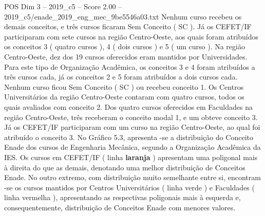 \begin{textsample}{POS Dim 3 – 2019\_c5 – Score 2.00 – 2019\_c5/enade\_2019\_eng\_mec\_9be5546a03.txt}
Nenhum curso recebeu os demais conceitos, e três cursos ficaram Sem Conceito ( SC ).
Já os CEFET/IF participaram com sete cursos na região Centro-Oeste, aos quais foram atribuídos os conceitos 3 ( quatro cursos ), 4 ( dois cursos ) e 5 ( um curso ).
Na região Centro-Oeste, dez dos 19 cursos oferecidos eram mantidos por Universidades.
Para este tipo de Organização Acadêmica, os conceitos 3 e 4 foram atribuídos a três cursos cada, já os conceitos 2 e 5 foram atribuídos a dois cursos cada.
Nenhum curso ficou Sem Conceito ( SC ) ou recebeu conceito 1.
Os Centros Universitários da região Centro-Oeste contaram com quatro cursos, todos os quais avaliados com conceito 2.
Dos quatro cursos oferecidos em Faculdades na região Centro-Oeste, três receberam o conceito modal 1, e um obteve conceito 3.
Já os CEFET/IF participaram com um curso na região Centro-Oeste, ao qual foi atribuído o conceito 3.
No Gráfico 5.3, apresenta -se a distribuição do Conceito Enade dos cursos de Engenharia Mecânica, segundo a Organização Acadêmica da IES.
Os cursos em CEFET/IF ( linha \textbf{laranja} ) apresentam uma poligonal mais à direita do que as demais, denotando uma melhor distribuição de Conceitos Enade.
No outro extremo, com distribuição muito semelhante entre si, encontram -se os cursos mantidos por Centros Universitários ( linha verde ) e Faculdades ( linha vermelha ), apresentando as respectivas poligonais mais à esquerda e, consequentemente, distribuição de Conceitos Enade com menores valores.

\end{textsample}
